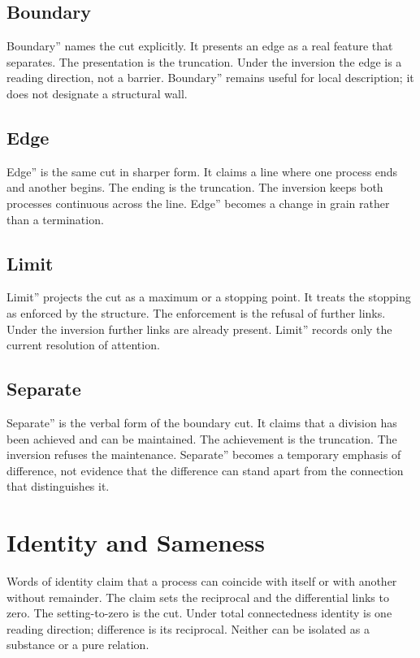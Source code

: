 \documentclass[11pt,a4paper]{article}
\begin{document}
\subsection{Boundary} Boundary'' names the cut explicitly. It presents an edge as a real feature that separates. The presentation is the truncation. Under the inversion the edge is a reading direction, not a barrier. Boundary'' remains useful for local description; it does not designate a structural wall.

\subsection{Edge} Edge'' is the same cut in sharper form. It claims a line where one process ends and another begins. The ending is the truncation. The inversion keeps both processes continuous across the line. Edge'' becomes a change in grain rather than a termination.

\subsection{Limit} Limit'' projects the cut as a maximum or a stopping point. It treats the stopping as enforced by the structure. The enforcement is the refusal of further links. Under the inversion further links are already present. Limit'' records only the current resolution of attention.

\subsection{Separate} Separate'' is the verbal form of the boundary cut. It claims that a division has been achieved and can be maintained. The achievement is the truncation. The inversion refuses the maintenance. Separate'' becomes a temporary emphasis of difference, not evidence that the difference can stand apart from the connection that distinguishes it.

\section{Identity and Sameness}

Words of identity claim that a process can coincide with itself or with another without remainder. The claim sets the reciprocal and the differential links to zero. The setting-to-zero is the cut. Under total connectedness identity is one reading direction; difference is its reciprocal. Neither can be isolated as a substance or a pure relation.
\end{document}
